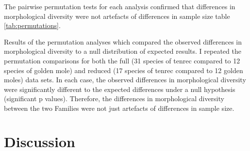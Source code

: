 	The pairwise permutation tests for each analysis confirmed that differences in morphological diversity were not artefacts of differences in sample size table \ref{tab:permutations}.
	

\begin{table}[!htbp]			
	\caption[Results of the permutation tests]{Results of the permutation analyses which compared the observed differences in morphological diversity to a null distribution of expected results. I repeated the permutation comparisons for both the full (31 species of tenrec compared to 12 species of golden mole) and reduced (17 species of tenrec compared to 12 golden moles) data sets. In each case, the observed differences in morphological diversity were significantly different to the expected differences under a null hypothesis (significant p values). Therefore, the differences in morphological diversity between the two Families were not just artefacts of differences in sample size.}
	 
	\label{tab:permutations}  
\end{table}
	

\section{Discussion}




